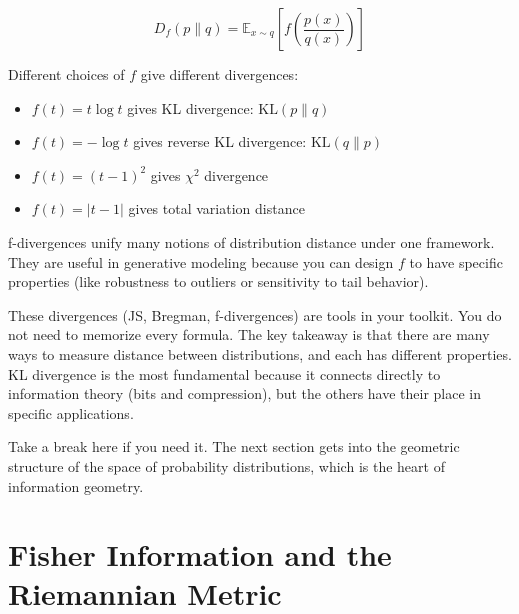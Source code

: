 \begin{equation}
D_f(p \| q) = \mathbb{E}_{x \sim q}\left[f\left(\frac{p(x)}{q(x)}\right)\right]
\end{equation}

Different choices of $f$ give different divergences:

\begin{itemize}
\item $f(t) = t \log t$ gives KL divergence: $\text{KL}(p \| q)$

\item $f(t) = -\log t$ gives reverse KL divergence: $\text{KL}(q \| p)$

\item $f(t) = (t - 1)^2$ gives $\chi^2$ divergence

\item $f(t) = |t - 1|$ gives total variation distance
\end{itemize}

\vspace{1em}

f-divergences unify many notions of distribution distance under one framework. They are useful in generative modeling because you can design $f$ to have specific properties (like robustness to outliers or sensitivity to tail behavior).

\vspace{2em}

These divergences (JS, Bregman, f-divergences) are tools in your toolkit. You do not need to memorize every formula. The key takeaway is that there are many ways to measure distance between distributions, and each has different properties. KL divergence is the most fundamental because it connects directly to information theory (bits and compression), but the others have their place in specific applications.

\vspace{2em}

Take a break here if you need it. The next section gets into the geometric structure of the space of probability distributions, which is the heart of information geometry.

\vspace{2em}

\section{Fisher Information and the Riemannian Metric}

